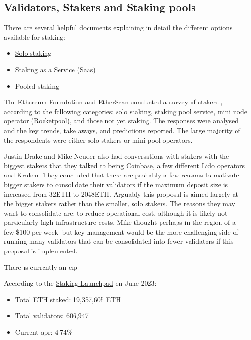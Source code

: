 \documentclass[UTF8]{article}
\begin{document}
\subsection{Validators, Stakers and Staking pools}
\label{sec:stakers}
There are several helpful documents explaining in detail the different options available for staking:
\begin{itemize}
\item \href{https://ethereum.org/en/staking/solo/}{Solo staking}
\item \href{https://ethereum.org/en/staking/saas/}{Staking as a Service (Saas)}
\item \href{https://ethereum.org/en/staking/pools/}{Pooled staking}
\end{itemize}

The Ethereum Foundation and EtherScan conducted a survey of stakers \cite{Smith2023}, according to the following categories: solo staking, staking pool service, mini node operator (Rocketpool), and those not yet staking. The responses were analysed and the key trends, take aways, and predictions reported. The large majority of the respondents were either solo stakers or mini pool operators.


Justin Drake and Mike Neuder also had conversations with stakers with the biggest stakers that they talked to being Coinbase, a few different Lido operators and Kraken. They concluded that there are probably a few reasons to motivate bigger stakers to consolidate their validators if the maximum deposit size is increased from 32ETH to 2048ETH. Arguably this proposal is aimed largely at the bigger stakers rather than the smaller, solo stakers. The reasons they may want to consolidate are: to reduce operational cost, although it is likely not particularly high infrastructure costs, Mike thought perhaps in the region of a few \$100 per week, but key management would be the more challenging side of running many validators that can be consolidated into fewer validators if this proposal is implemented. 

There is currently an \gls{eip} 

According to the \href{https://launchpad.ethereum.org/en/}{Staking Launchpad} on June 2023:
\begin{itemize}
\item Total ETH staked: 19,357,605 ETH
\item Total validators: 606,947
\item Current \gls{apr}: 4.74\%
\end{itemize}
\end{document}
